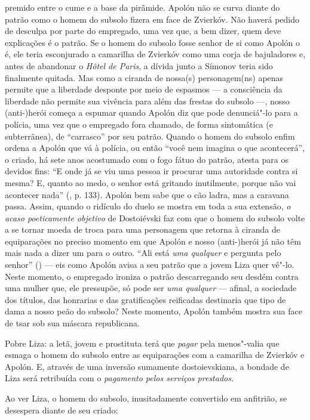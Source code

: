 premido entre o cume e a base da pirâmide. Apolón não se curva diante do
patrão como o homem do subsolo fizera em face de Zvierkóv. Não haverá
pedido de desculpa por parte do empregado, uma vez que, a bem dizer,
quem deve explicações é o patrão. Se o homem do subsolo fosse senhor de
si como Apolón o é, ele teria esconjurado a camarilha de Zvierkóv como
uma corja de bajuladores e, antes de abandonar o \emph{Hôtel de Paris},
a dívida junto a Símonov teria sido finalmente quitada. Mas como a
ciranda de nossa(s) personagem(ns) apenas permite que a liberdade
desponte por meio de espasmos --- a consciência da liberdade não permite
sua vivência para além das frestas do subsolo ---, nosso \mbox{(anti-)herói}
começa a espumar quando Apolón diz que pode denunciá"-lo para a polícia,
uma vez que o empregado fora chamado, de forma sintomática (e
subterrânea), de ``carrasco'' por seu patrão. Quando o homem do subsolo
enfim ordena a Apolón que vá à polícia, ou então ``você nem imagina o
que acontecerá'', o criado, há sete anos acostumado com o fogo fátuo do
patrão, atesta para os devidos fins: ``E onde já se viu uma pessoa ir
procurar uma autoridade contra si mesma? E, quanto ao medo, o senhor
está gritando inutilmente, porque não vai acontecer nada'' (, p.
133). Apolón bem sabe que o cão ladra, mas a caravana passa. Assim,
quando o ridículo do duelo se mostra em toda a sua extensão, \emph{o
acaso poeticamente objetivo} de Dostoiévski faz com que o homem do
subsolo volte a se tornar moeda de troca para uma personagem que retorna
à ciranda de equiparações no preciso momento em que Apolón e nosso
\mbox{(anti-)herói} já não têm mais nada a dizer um para o outro. ``Ali está
\emph{uma qualquer} e pergunta pelo senhor'' () --- eis como Apolón
avisa a seu patrão que a jovem Liza quer vê"-lo. Neste momento, o
empregado ironiza o patrão descarregando seu desdém contra uma mulher
que, ele pressupõe, só pode ser \emph{uma qualquer} --- afinal, a
sociedade dos títulos, das honrarias e das gratificações reificadas
destinaria que tipo de dama a nosso peão do subsolo? Neste momento,
Apolón também mostra sua face de tsar sob sua máscara republicana.

Pobre Liza: a letã, jovem e prostituta terá que \emph{pagar} pela
menos"-valia que esmaga o homem do subsolo entre as equiparações com a
camarilha de Zvierkóv e Apolón. E, através de uma inversão sumamente
dostoievskiana, a bondade de Liza será retribuída com o \emph{pagamento
pelos serviços prestados. }

Ao ver Liza, o homem do subsolo, inusitadamente convertido em anfitrião,
se desespera diante de seu criado:

